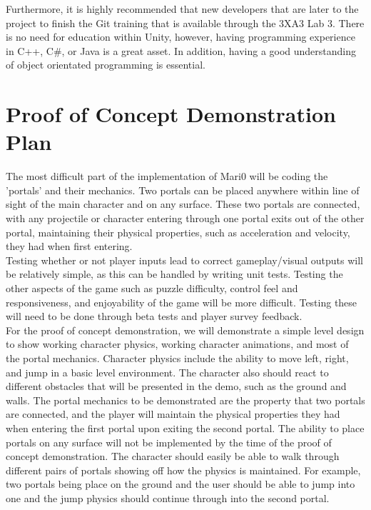 \documentclass{article}
\begin{document}
Furthermore, it is highly recommended that new developers that are later to the project to finish the Git training that is available through the 3XA3 Lab 3. There is no need for education within Unity, however, having programming experience in C++, C\#, or Java is a great asset. In addition, having a good understanding of object orientated programming is essential. 

\section{Proof of Concept Demonstration Plan}
The most difficult part of the implementation of Mari0 will be coding the 'portals' and their mechanics. Two portals can be placed anywhere within line of sight of the main character and on any surface. These two portals are connected, with any projectile or character entering through one portal exits out of the other portal, maintaining their physical properties, such as acceleration and velocity, they had when first entering.
\\

Testing whether or not player inputs lead to correct gameplay/visual outputs will be relatively simple, as this can be handled by writing unit tests. Testing the other aspects of the game such as puzzle difficulty, control feel and responsiveness, and enjoyability of the game will be more difficult. Testing these will need to be done through beta tests and player survey feedback.
\\

For the proof of concept demonstration, we will demonstrate a simple level design to show working character physics, working character animations, and most of the portal mechanics. Character physics include the ability to move left, right, and jump in a basic level environment. The character also should react to different obstacles that will be presented in the demo, such as the ground and walls. The portal mechanics to be demonstrated are the property that two portals are connected, and the player will maintain the physical properties they had when entering the first portal upon exiting the second portal. The ability to place portals on any surface will not be implemented by the time of the proof of concept demonstration. The character should easily be able to walk through different pairs of portals showing off how the physics is maintained. For example, two portals being place on the ground and the user should be able to jump into one and the jump physics should continue through into the second portal.
\end{document}
